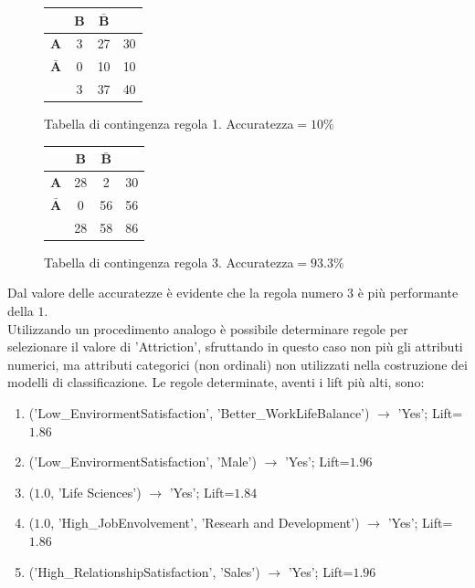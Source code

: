 \documentclass[a4paper,9pt]{article}
\begin{document}
\begin{figure}[H]
  \centering
  \begin{minipage}{.45\textwidth}
    \centering
    \begin{tabular}{l|cc|r}
& \bfseries B & $\bar{\textbf {B}}$ &\\
\hline
\bfseries A & 3 & 27 &30\\
 $\bar{\textbf {A}}$ & 0&10&10\\
\hline
& 3&37&40\\
\end{tabular}
    \caption{Tabella di contingenza regola 1. Accuratezza$=10\%$}
  \end{minipage}
  \begin{minipage}{.45\textwidth}
    \centering
    \begin{tabular}{l|cc|r}
& \bfseries B &  $\bar{\textbf {B}}$ &\\
\hline
\bfseries A & 28& 2 &30\\
 $\bar{\textbf {A}}$ & 0&56&56\\
\hline
& 28&58&86\\
\end{tabular}
    \caption{Tabella di contingenza regola 3.  Accuratezza$=93.3\%$}
  \end{minipage}
  \end{figure}

Dal valore delle accuratezze è evidente che la regola numero $3$ è più performante della $1$.\\

Utilizzando un procedimento analogo è possibile determinare regole per selezionare il valore di 'Attriction', sfruttando in questo caso non più gli attributi numerici, ma attributi categorici (non ordinali) non utilizzati nella costruzione dei modelli di classificazione.
Le regole determinate, aventi i lift più alti, sono:

\begin{enumerate}
\item ('Low\_EnvirormentSatisfaction', 'Better\_WorkLifeBalance') $\longrightarrow$ 'Yes'; Lift=$1.86$
\item ('Low\_EnvirormentSatisfaction', 'Male') $\longrightarrow$ 'Yes'; Lift=$1.96$
\item ($1.0$, 'Life Sciences') $\longrightarrow$ 'Yes'; Lift=$1.84$
\item ($1.0$, 'High\_JobEnvolvement', 'Researh and Development') $\longrightarrow$ 'Yes'; Lift=$1.86$
\item ('High\_RelationshipSatisfaction', 'Sales') $\longrightarrow$ 'Yes'; Lift=$1.96$
\end{enumerate}
\end{document}
